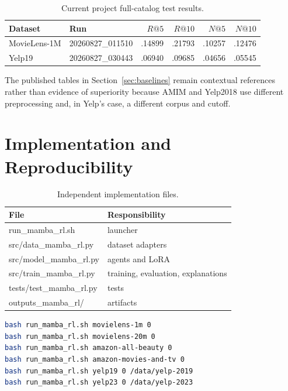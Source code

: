 \documentclass[11pt,a4paper]{article}
\begin{document}
\begin{table}[H]
\centering
\caption{Current project full-catalog test results.}
\label{tab:ml-yelp-project}
\begin{tabular}{@{}llrrrr@{}}
\toprule
Dataset & Run & $R@5$ & $R@10$ & $N@5$ & $N@10$ \\
\midrule
MovieLens-1M & 20260827\_011510 & .14899 & .21793 & .10257 & .12476 \\
Yelp19 & 20260827\_030443 & .06940 & .09685 & .04656 & .05545 \\
\bottomrule
\end{tabular}
\end{table}

The published tables in Section~\ref{sec:baselines} remain contextual
references rather than evidence of superiority because AMIM and Yelp2018 use
different preprocessing and, in Yelp's case, a different corpus and cutoff.

\section{Implementation and Reproducibility}

\begin{table}[H]
\centering
\caption{Independent implementation files.}
\begin{tabularx}{\textwidth}{>{\ttfamily}p{}X}
\toprule
File & Responsibility\\
\midrule
run\_mamba\_rl.sh & launcher\\
src/data\_mamba\_rl.py & dataset adapters\\
src/model\_mamba\_rl.py & agents and LoRA\\
src/train\_mamba\_rl.py & training, evaluation, explanations\\
tests/test\_mamba\_rl.py & tests\\
outputs\_mamba\_rl/ & artifacts\\
\bottomrule
\end{tabularx}
\end{table}

\begin{lstlisting}[language=bash]
bash run_mamba_rl.sh movielens-1m 0
bash run_mamba_rl.sh movielens-20m 0
bash run_mamba_rl.sh amazon-all-beauty 0
bash run_mamba_rl.sh amazon-movies-and-tv 0
bash run_mamba_rl.sh yelp19 0 /data/yelp-2019
bash run_mamba_rl.sh yelp23 0 /data/yelp-2023
\end{lstlisting}
\end{document}
